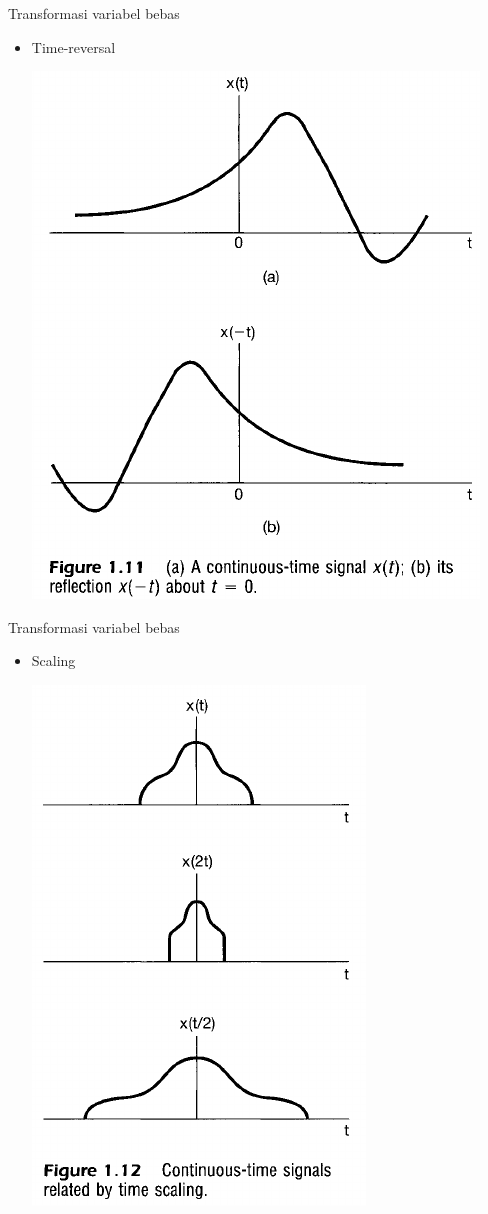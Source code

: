 \documentclass[pdflatex,compress,mathserif]{beamer}
\begin{document}
\begin{frame}{Transformasi variabel bebas}
	\begin{itemize}
		\item Time-reversal
		\begin{center}
			\includegraphics[width=0.5\linewidth]{img/img21}
		\end{center}
	\end{itemize}
\end{frame}

\begin{frame}{Transformasi variabel bebas}
	\begin{itemize}
		\item Scaling
		\begin{center}
			\includegraphics[width=0.4\linewidth]{img/img22}
		\end{center}
	\end{itemize}
\end{frame}
\end{document}
